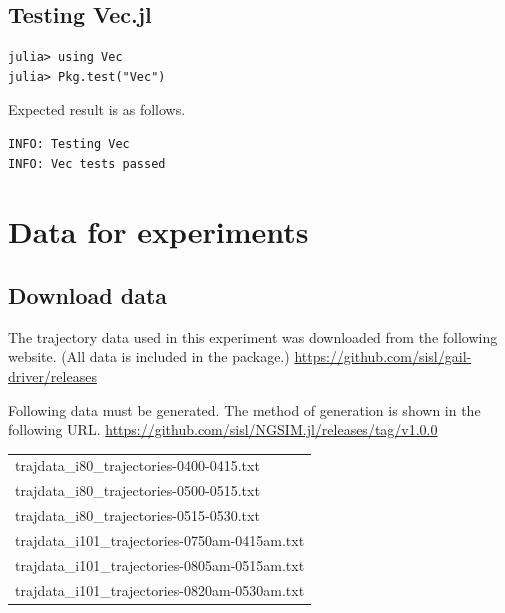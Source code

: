 \documentclass[openany,11pt]{report}%
\begin{document}
\section{Testing Vec.jl}

\begin{lstlisting}[style=DOS]
julia> using Vec
julia> Pkg.test("Vec")
\end{lstlisting}

Expected result is as follows.

\begin{lstlisting}[style=DOS]
INFO: Testing Vec
INFO: Vec tests passed
\end{lstlisting}

\chapter{Data for experiments}

\section{Download data}

The trajectory data used in this experiment was downloaded from the following website. (All data is included in the package.)
\url{https://github.com/sisl/gail-driver/releases}

Following data must be generated. 
The method of generation is shown in the following URL.
\url{https://github.com/sisl/NGSIM.jl/releases/tag/v1.0.0}

\begin{tabular}{l}
trajdata\_i80\_trajectories-0400-0415.txt \\
trajdata\_i80\_trajectories-0500-0515.txt \\
trajdata\_i80\_trajectories-0515-0530.txt \\
trajdata\_i101\_trajectories-0750am-0415am.txt \\
trajdata\_i101\_trajectories-0805am-0515am.txt \\
trajdata\_i101\_trajectories-0820am-0530am.txt \\
\end{tabular}
\end{document}
